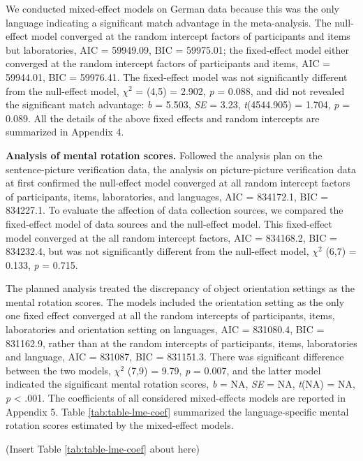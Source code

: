 \documentclass[
  man,floatsintext]{apa6}
\begin{document}
We conducted mixed-effect models on German data because this was the only language indicating a significant match advantage in the meta-analysis. The null-effect model converged at the random intercept factors of participants and items but laboratories, AIC = 59949.09, BIC = 59975.01; the fixed-effect model either converged at the random intercept factors of participants and items, AIC = 59944.01, BIC = 59976.41. The fixed-effect model was not significantly different from the null-effect model, \({\chi}^2\) = (4,5) = 2.902, \emph{p} = 0.088, and did not revealed the significant match advantage: \emph{b} = 5.503, \emph{SE} = 3.23, \emph{t}(4544.905) = 1.704, \emph{p} = 0.089. All the details of the above fixed effects and random intercepts are summarized in Appendix 4.

\textbf{Analysis of mental rotation scores.} Followed the analysis plan on the sentence-picture verification data, the analysis on picture-picture verification data at first confirmed the null-effect model converged at all random intercept factors of participants, items, laboratories, and languages, AIC = 834172.1, BIC = 834227.1. To evaluate the affection of data collection sources, we compared the fixed-effect model of data sources and the null-effect model. This fixed-effect model converged at the all random intercept factors, AIC = 834168.2, BIC = 834232.4, but was not significantly different from the null-effect model, \({\chi}^2\) (6,7) = 0.133, \emph{p} = 0.715.

The planned analysis treated the discrepancy of object orientation settings as the mental rotation scores. The models included the orientation setting as the only one fixed effect converged at all the random intercepts of participants, items, laboratories and orientation setting on languages, AIC = 831080.4, BIC = 831162.9, rather than at the random intercepts of participants, items, laboratories and language, AIC = 831087, BIC = 831151.3. There was significant difference between the two models, \({\chi}^2\) (7,9) = 9.79, \emph{p} = 0.007, and the latter model indicated the significant mental rotation scores, \emph{b} = NA, \emph{SE} = NA, \emph{t}(NA) = NA, \emph{p} \textless{} .001. The coefficients of all considered mixed-effects models are reported in Appendix 5. Table \ref{tab:table-lme-coef} summarized the language-specific mental rotation scores estimated by the mixed-effect models.

(Insert Table \ref{tab:table-lme-coef} about here)

\providecommand{\docline}[3]{\noalign{\global\setlength{\arrayrulewidth}{#1}}\arrayrulecolor[HTML]{#2}\cline{#3}}
\end{document}
